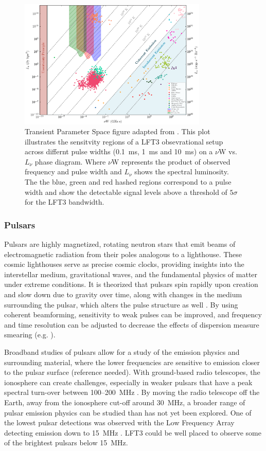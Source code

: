 \begin{figure}[!ht]
    \centering
    \includegraphics[width=0.8\textwidth]{figures/phase_space.png} 
    \caption{Transient Parameter Space figure adapted from \citet{pietka}. This plot illustrates the sensitvity regions of a LFT3 obsevrational setup across differnt pulse widths (0.1~ms, 1~ms and 10~ms) on a $\nu \text{W}$ vs. $L_\nu$ phase diagram. Where $\nu \text{W}$ represents the product of observed frequency and pulse width and $L_\nu$ shows the spectral luminosity. The the blue, green and red hashed regions correspond to a pulse width and show the detectable signal levels above a threshold of $5\sigma$ for the LFT3 bandwidth.}
    \label{fig:transient_space}
\end{figure}

\subsubsection{Pulsars}
Pulsars are highly magnetized, rotating neutron stars that emit beams of electromagnetic radiation from their poles analogous to a lighthouse. These cosmic lighthouses serve as precise cosmic clocks, providing insights into the interstellar medium, gravitational waves, and the fundamental physics of matter under extreme conditions. It is theorized that pulsars spin rapidly upon creation and slow down due to gravity over time, along with changes in the medium surrounding the pulsar, which alters the pulse structure as well \citep{LW_2013}. By using coherent beamforming, sensitivity to weak pulses can be improved, and frequency and time resolution can be adjusted to decrease the effects of dispersion measure smearing (e.g. \cite{WL_2020}).

Broadband studies of pulsars allow for a study of the emission physics and surrounding material, where the lower frequencies are sensitive to emission closer to the pulsar surface (reference needed). With ground-based radio telescopes, the ionosphere can create challenges, especially in weaker pulsars that have a peak spectral turn-over between 100--200~MHz \citep{Stappers_2011}. By moving the radio telescope off the Earth, away from the ionosphere cut-off around 30~MHz, a broader range of pulsar emission physics can be studied than has not yet been explored. One of the lowest pulsar detections was observed with the Low Frequency Array detecting emission down to 15~MHz \citep{Kondratiev_2012}. LFT3 could be well placed to observe some of the brightest pulsars below 15~MHz. 

